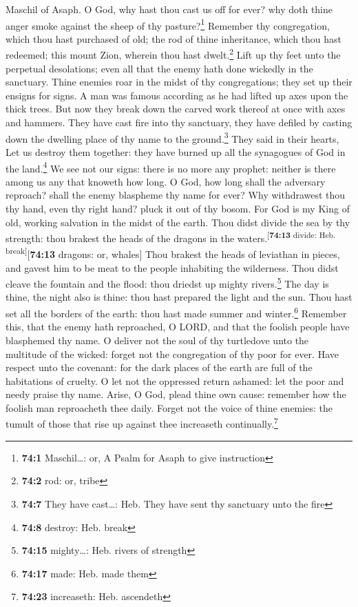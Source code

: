 Maschil of Asaph.  O God, why hast thou cast us off for
ever? why doth thine anger smoke against the sheep of thy
pasture?\footnote{\textbf{74:1} Maschil\ldots: or, A Psalm for Asaph to
  give instruction}  Remember thy congregation, which thou
hast purchased of old; the rod of thine inheritance, which thou hast
redeemed; this mount Zion, wherein thou hast dwelt.\footnote{\textbf{74:2}
  rod: or, tribe}  Lift up thy feet unto the perpetual
desolations; even all that the enemy hath done wickedly in the
sanctuary.  Thine enemies roar in the midst of thy
congregations; they set up their ensigns for signs.  A man
was famous according as he had lifted up axes upon the thick trees.
 But now they break down the carved work thereof at once
with axes and hammers.  They have cast fire into thy
sanctuary, they have defiled by casting down the dwelling place of thy
name to the ground.\footnote{\textbf{74:7} They have cast\ldots: Heb.
  They have sent thy sanctuary unto the fire}  They said
in their hearts, Let us destroy them together: they have burned up all
the synagogues of God in the land.\footnote{\textbf{74:8} destroy: Heb.
  break}  We see not our signs: there is no more any
prophet: neither is there among us any that knoweth how long.
 O God, how long shall the adversary reproach? shall the
enemy blaspheme thy name for ever?  Why withdrawest thou
thy hand, even thy right hand? pluck it out of thy bosom.
 For God is my King of old, working salvation in the
midst of the earth.  Thou didst divide the sea by thy
strength: thou brakest the heads of the dragons in the
waters.\textsuperscript{{[}\textbf{74:13} divide: Heb.
break{]}}{[}\textbf{74:13} dragons: or, whales{]}  Thou
brakest the heads of leviathan in pieces, and gavest him to be meat to
the people inhabiting the wilderness.  Thou didst cleave
the fountain and the flood: thou driedst up mighty rivers.\footnote{\textbf{74:15}
  mighty\ldots: Heb. rivers of strength}  The day is
thine, the night also is thine: thou hast prepared the light and the
sun.  Thou hast set all the borders of the earth: thou
hast made summer and winter.\footnote{\textbf{74:17} made: Heb. made
  them}  Remember this, that the enemy hath reproached, O
LORD, and that the foolish people have blasphemed thy name.
 O deliver not the soul of thy turtledove unto the
multitude of the wicked: forget not the congregation of thy poor for
ever.  Have respect unto the covenant: for the dark
places of the earth are full of the habitations of cruelty.
 O let not the oppressed return ashamed: let the poor and
needy praise thy name.  Arise, O God, plead thine own
cause: remember how the foolish man reproacheth thee daily.
 Forget not the voice of thine enemies: the tumult of
those that rise up against thee increaseth continually.\footnote{\textbf{74:23}
  increaseth: Heb. ascendeth}

